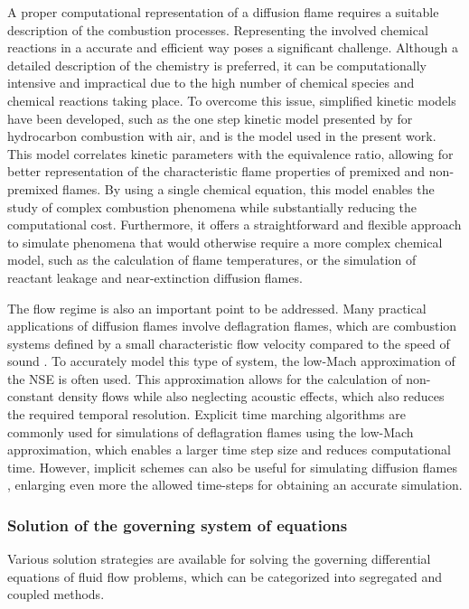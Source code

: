 A proper computational representation of a diffusion flame requires a suitable description of the combustion processes. Representing the involved chemical reactions in a accurate and efficient way poses a significant challenge. Although a detailed description of the chemistry is preferred, it can be computationally intensive and impractical due to the high number of chemical species and chemical reactions taking place. To overcome this issue, simplified kinetic models have been developed, such as the one step kinetic model presented by \textcite{fernandez-tarrazoSimpleOnestepChemistry2006} for hydrocarbon combustion with air, and is the model used in the present work. This model correlates kinetic parameters with the equivalence ratio, allowing for better representation of the characteristic flame properties of premixed and non-premixed flames. By using a single chemical equation, this model enables the study of complex combustion phenomena while substantially reducing the computational cost. Furthermore, it offers a straightforward and flexible approach to simulate phenomena that would otherwise require a more complex chemical model, such as the calculation of flame temperatures, or the simulation of reactant leakage and near-extinction diffusion flames.
 
The flow regime is also an important point to be addressed. Many practical applications of diffusion flames involve deflagration flames, which are combustion systems defined by a small characteristic flow velocity compared to the speed of sound  \parencite{poinsotTheoreticalNumericalCombustion2011}. To accurately model this type of system, the low-Mach approximation of the \Gls{NSE} is often used. This approximation allows for the calculation of non-constant density flows while also neglecting acoustic effects, which also reduces the required temporal resolution. Explicit time marching algorithms are commonly used for simulations of deflagration flames using the low-Mach approximation, which enables a larger time step size and reduces computational time. However, implicit schemes can also be useful for simulating diffusion flames \parencite{mullerLowMachNumberAsymptoticsNavierStokes1998}, enlarging even more the allowed time-steps for obtaining an accurate simulation. 
\subsubsection{Solution of the governing system of equations}
Various solution strategies are available for solving the governing differential equations of fluid flow problems, which can be categorized into segregated and coupled methods.

